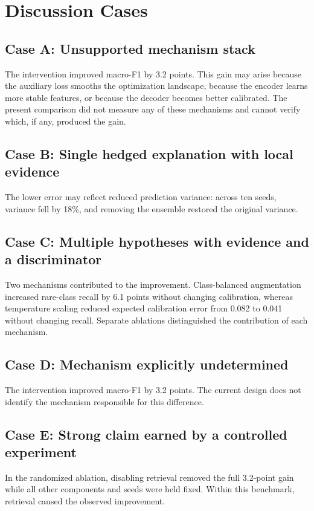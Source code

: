 \section{Discussion Cases}

\subsection{Case A: Unsupported mechanism stack}
The intervention improved macro-F1 by 3.2 points. This gain may arise because the
auxiliary loss smooths the optimization landscape, because the encoder learns more stable
features, or because the decoder becomes better calibrated. The present comparison did not
measure any of these mechanisms and cannot verify which, if any, produced the gain.

\subsection{Case B: Single hedged explanation with local evidence}
The lower error may reflect reduced prediction variance: across ten seeds, variance fell by
18\%, and removing the ensemble restored the original variance.

\subsection{Case C: Multiple hypotheses with evidence and a discriminator}
Two mechanisms contributed to the improvement. Class-balanced augmentation increased
rare-class recall by 6.1 points without changing calibration, whereas temperature scaling
reduced expected calibration error from 0.082 to 0.041 without changing recall. Separate
ablations distinguished the contribution of each mechanism.

\subsection{Case D: Mechanism explicitly undetermined}
The intervention improved macro-F1 by 3.2 points. The current design does not identify the
mechanism responsible for this difference.

\subsection{Case E: Strong claim earned by a controlled experiment}
In the randomized ablation, disabling retrieval removed the full 3.2-point gain while all
other components and seeds were held fixed. Within this benchmark, retrieval caused the
observed improvement.
